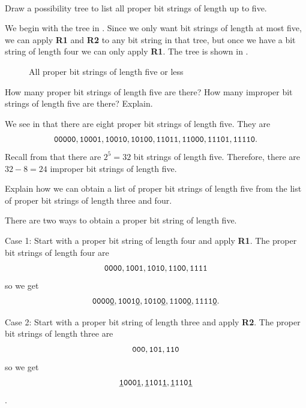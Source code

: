 \begin{exam}
\label{exam_proper_bs5}
~
    \begin{apart}
        \item Draw a possibility tree to list all proper bit strings of length up to five.
            \begin{soln}
                We begin with the tree in . Since we only want bit strings of length at most five, we can apply \textbf{R1} and \textbf{R2} to any bit string in that tree, but once we have a bit string of length four we can only apply \textbf{R1}.  The tree is shown in .
            \end{soln}
            \begin{figure}[hbtp]
                \centering
                
                \caption{All proper bit strings of length five or less}
                \label{fig_tree_proper_bs5}
            \end{figure}
        \item How many proper bit strings of length five are there?  How many improper bit strings of length five are there? Explain.
            \begin{soln}
                We see in  that there are eight proper bit strings of length five. They are
                    $$\texttt{00000}, \texttt{10001}, \texttt{10010}, \texttt{10100}, \texttt{11011}, \texttt{11000}, \texttt{11101}, \texttt{11110}.$$
                Recall from  that there are $2^5=32$ bit strings of length five.  Therefore, there are $32-8 = 24$ improper bit strings of length five.
            \end{soln}
        \item Explain how we can obtain a list of proper bit strings of length five from the list of proper bit strings of length three and four.
            \begin{soln}
                There are two ways to obtain a proper bit string of length five. 
                
                Case 1: Start with a proper bit string of length four and apply \textbf{R1}.  The proper bit strings of length four are
                    $$\texttt{0000}, \texttt{1001}, \texttt{1010}, \texttt{1100}, \texttt{1111}$$
                so we get
                    $$\texttt{0000\underline{0}}, \texttt{1001\underline{0}}, \texttt{1010\underline{0}}, \texttt{1100\underline{0}}, \texttt{1111\underline{0}}.$$
                
                Case 2:  Start with a proper bit string of length three and apply \textbf{R2}. The proper bit strings of length three are
                    $$\texttt{000}, \texttt{101}, \texttt{110}$$
                so we get
                    $$\texttt{\underline{1}000\underline{1}}, \texttt{\underline{1}101\underline{1}}, \texttt{\underline{1}110\underline{1}}$$.
            \end{soln}
    \end{apart}
\end{exam}

